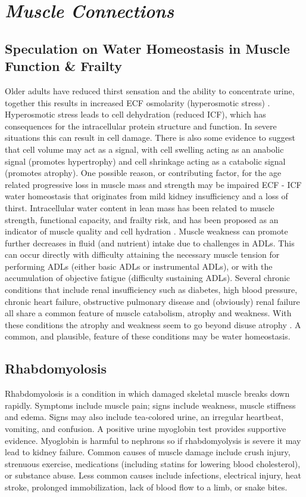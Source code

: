 \section{\textit{Muscle Connections}}

\subsection{Speculation on Water Homeostasis in Muscle Function \& Frailty}
Older adults have reduced thirst sensation and the ability to concentrate urine, together this results in increased ECF osmolarity (hyperosmotic stress) \cite{lorenzo_role_2019}. Hyperosmotic stress leads to cell dehydration (reduced ICF), which has consequences for the intracellular protein structure and function. In severe situations this can result in cell damage. There is also some evidence to suggest that cell volume may act as a signal, with cell swelling acting as an anabolic signal (promotes hypertrophy) and cell shrinkage acting as a catabolic signal (promotes atrophy). One possible reason, or contributing factor, for the age related progressive loss in muscle mass and strength may be impaired ECF - ICF water homeostasis that originates from mild kidney insufficiency and a loss of thirst. Intracellular water content in lean mass has been related to muscle strength, functional capacity, and frailty risk, and has been proposed as an indicator of muscle quality and cell hydration \cite{lorenzo_role_2019}. Muscle weakness can promote further decreases in fluid (and nutrient) intake due to challenges in ADLs. This can occur directly with difficulty attaining the necessary muscle tension for performing ADLs (either basic ADLs or instrumental ADLs), or with the accumulation of objective fatigue (difficulty sustaining ADLs)\cite{collins_heart_2015}.  Several chronic conditions that include renal insufficiency such as diabetes, high blood pressure, chronic heart failure, obstructive pulmonary disease and (obviously) renal failure all share a common feature of muscle catabolism, atrophy and weakness. With these conditions the atrophy and weakness seem to go beyond disuse atrophy \cite{adams_skeletal_2006}. A common, and plausible, feature of these conditions may be water homeostasis. 


\subsection{Rhabdomyolosis}
Rhabdomyolosis is a condition in which damaged skeletal muscle breaks down rapidly. Symptoms include muscle pain; signs include weakness, muscle stiffness and edema. Signs may also include tea-colored urine, an irregular heartbeat, vomiting, and confusion. A positive urine myoglobin test provides supportive evidence. Myoglobin is harmful to nephrons so if rhabdomyolysis is severe it may lead to kidney failure. Common causes of muscle damage include crush injury, strenuous exercise, medications (including statins for lowering blood cholesterol), or substance abuse. Less common causes include infections, electrical injury, heat stroke, prolonged immobilization, lack of blood flow to a limb, or snake bites.


